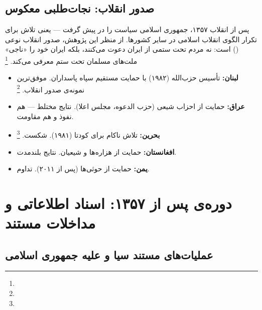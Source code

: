 \subsection{صدور انقلاب: نجات‌طلبی معکوس}
\label{subsec:ch07-export-revolution}

پس از انقلاب ۱۳۵۷، جمهوری اسلامی سیاست  را در پیش گرفت — یعنی تلاش برای تکرار الگوی انقلاب اسلامی در سایر کشورها. از منظر این پژوهش، صدور انقلاب نوعی  () است: نه مردم تحت ستمی از ایران دعوت می‌کنند، بلکه ایران خود را «ناجی» ملت‌های مسلمان تحت ستم معرفی می‌کند.%
\footnote{}

\begin{tcolorbox}[defbox, title={صدور انقلاب: مصادیق و نتایج}]
\begin{itemize}[nosep, rightmargin=1em]
  \item \textbf{لبنان:} تأسیس حزب‌الله (۱۹۸۲) با حمایت مستقیم سپاه پاسداران. موفق‌ترین نمونه‌ی صدور انقلاب.%
  \footnote{}
  \item \textbf{عراق:} حمایت از احزاب شیعی (حزب الدعوه، مجلس اعلا). نتایج مختلط — هم نفوذ و هم مقاومت.
  \item \textbf{بحرین:} تلاش ناکام برای کودتا (۱۹۸۱). شکست.%
  \footnote{}
  \item \textbf{افغانستان:} حمایت از هزاره‌ها و شیعیان. نتایج بلندمدت.
  \item \textbf{یمن:} حمایت از حوثی‌ها (پس از ۲۰۱۱). تداوم.
\end{itemize}
\end{tcolorbox}

\section{دوره‌ی پس از ۱۳۵۷: اسناد اطلاعاتی و مداخلات مستند}
\label{sec:ch07-post-revolution}

\subsection{عملیات‌های مستند سیا و \texorpdfstring{}{MI6} علیه جمهوری اسلامی}
\label{subsec:ch07-cia-mi6}

